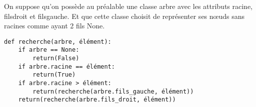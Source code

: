\documentclass[a4paper,12pt]{article}
\begin{document}
On suppose qu'on possède au préalable une classe arbre avec les attributs racine, fils\textunderscore{}droit et fils\textunderscore{}gauche. Et que cette classe choisit de représenter ses n\oe{}uds sans racines comme ayant 2 fils None.

\begin{verbatim}
def recherche(arbre, élément):
    if arbre == None:
        return(False)
    if arbre.racine == élément:
        return(True)
    if arbre.racine > élément:
        return(recherche(arbre.fils_gauche, élément))
    return(recherche(arbre.fils_droit, élément))
    
\end{verbatim}
\end{document}
